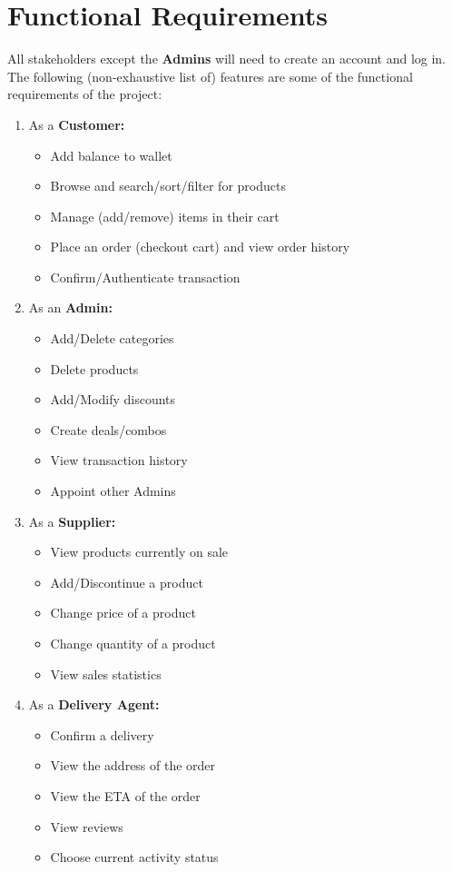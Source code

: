 \section*{\Huge Functional Requirements}
\vspace*{10pt}
All stakeholders except the \textbf{Admins} will need to create an account and log in.
The following (non-exhaustive list of) features are some of the functional requirements of the project:
\begin{enumerate}
    \item As a \textbf{Customer:}
    \begin{itemize}
        \item Add balance to wallet
        \item Browse and search/sort/filter for products
        \item Manage (add/remove) items in their cart
        \item Place an order (checkout cart) and view order history
        \item Confirm/Authenticate transaction
    \end{itemize}

    \item As an \textbf{Admin:}
    \begin{itemize}
        \item Add/Delete categories
        \item Delete products
        \item Add/Modify discounts
        \item Create deals/combos
        \item View transaction history
        \item Appoint other Admins
    \end{itemize}

    \item As a \textbf{Supplier:}
    \begin{itemize}
        \item View products currently on sale
        \item Add/Discontinue a product
        \item Change price of a product
        \item Change quantity of a product
        \item View sales statistics
    \end{itemize}

    \item As a \textbf{Delivery Agent:}
    \begin{itemize}
        \item Confirm a delivery
        \item View the address of the order
        \item View the ETA of the order
        \item View reviews
        \item Choose current activity status
    \end{itemize}
\end{enumerate}

\pagebreak